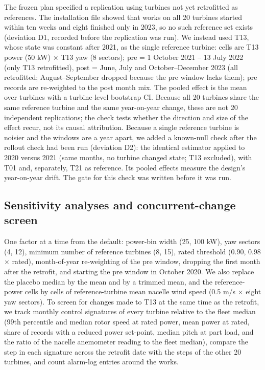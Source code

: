 \documentclass[preprint,12pt]{elsarticle}
\begin{document}
The frozen plan specified a replication using turbines not yet retrofitted as references. The installation file showed that works on all 20 turbines started within ten weeks and eight finished only in 2023, so no such reference set exists (deviation D1, recorded before the replication was run). We instead used T13, whose state was constant after 2021, as the single reference turbine: cells are T13 power (50 kW) × T13 yaw (8 sectors); pre = 1 October 2021 -- 13 July 2022 (only T13 retrofitted), post = June, July and October--December 2023 (all retrofitted; August--September dropped because the pre window lacks them); pre records are re-weighted to the post month mix. The pooled effect is the mean over turbines with a turbine-level bootstrap CI. Because all 20 turbines share the same reference turbine and the same year-on-year change, these are not 20 independent replications; the check tests whether the direction and size of the effect recur, not its causal attribution.
Because a single reference turbine is noisier and the windows are a year apart, we added a known-null check after the rollout check had been run (deviation D2): the identical estimator applied to 2020 versus 2021 (same months, no turbine changed state; T13 excluded), with T01 and, separately, T21 as reference. Its pooled effects measure the design's year-on-year drift. The gate for this check was written before it was run.

\subsection{Sensitivity analyses and concurrent-change screen}

One factor at a time from the default: power-bin width (25, 100 kW), yaw sectors (4, 12), minimum number of reference turbines (8, 15), rated threshold (0.90, 0.98 × rated), month-of-year re-weighting of the pre window, dropping the first month after the retrofit, and starting the pre window in October 2020. We also replace the placebo median by the mean and by a trimmed mean, and the reference-power cells by cells of reference-turbine mean nacelle wind speed (0.5 m/s × eight yaw sectors). To screen for changes made to T13 at the same time as the retrofit, we track monthly control signatures of every turbine relative to the fleet median (99th percentile and median rotor speed at rated power, mean power at rated, share of records with a reduced power set-point, median pitch at part load, and the ratio of the nacelle anemometer reading to the fleet median), compare the step in each signature across the retrofit date with the steps of the other 20 turbines, and count alarm-log entries around the works.
\end{document}
